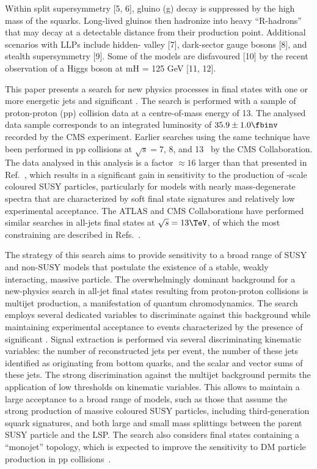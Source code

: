 Within split supersymmetry [5, 6], gluino (g) decay is suppressed by
the high mass of the squarks. Long-lived gluinos then hadronize into
heavy ``R-hadrons'' that may decay at a detectable distance from their
production point. Additional scenarios with LLPs include hidden-
valley [7], dark-sector gauge bosons [8], and stealth supersymmetry
[9]. Some of the models are disfavoured [10] by the recent observation
of a Higgs boson at mH = 125 GeV [11, 12].


This paper presents a search for new physics processes in final states
with one or more energetic jets and significant \ptvecmiss. The search
is performed with a sample of proton-proton (pp) collision data at a
centre-of-mass energy of 13\TeV. The analysed data sample corresponds
to an integrated luminosity of $35.9 \pm 1.0 \fbinv$ recorded by the
CMS experiment. Earlier searches using the same technique have been
performed in pp collisions at $\sqrt{s} = 7$, 8, and
13\TeV~\cite{RA1Paper, RA1Paper2011, RA1Paper2011FULL, RA1Paper2012,
  RA1Parked, Khachatryan:2016dvc} by the CMS Collaboration. The data
analysed in this analysis is a factor ${\approx}16$ larger than that
presented in Ref.~\cite{Khachatryan:2016dvc}, which results in a
significant gain in sensitivity to the production of \TeV-scale
coloured SUSY particles, particularly for models with nearly
mass-degenerate spectra that are characterized by soft final state
signatures and relatively low experimental acceptance. The ATLAS and
CMS Collaborations have performed similar searches in all-jets final
states at $\sqrt{s} = 13\TeV$, of which the most constraining are
described in Refs.~\cite{}.

The strategy of this search aims to provide sensitivity to a broad
range of SUSY and non-SUSY models that postulate the existence of a
stable, weakly interacting, massive particle. The overwhelmingly
dominant background for a new-physics search in all-jet final states
resulting from proton-proton collisions is multijet production, a
manifestation of quantum chromodynamics. The search employs several
dedicated variables to discriminate against this background while
maintaining experimental acceptance to events characterized by the
presence of significant \ptvecmiss. Signal extraction is performed via
several discriminating kinematic variables: the number of
reconstructed jets per event, the number of these jets identified as
originating from bottom quarks, and the scalar and vector \pt sums of
these jets. The strong discrimination against the multijet background
permits the application of low thresholds on kinematic variables. This
allows to maintain a large acceptance to a broad range of models, such
as those that assume the strong production of massive coloured SUSY
particles, including third-generation squark signatures, and both
large and small mass splittings between the parent SUSY particle and
the LSP. The search also considers final states containing a
``monojet'' topology, which is expected to improve the sensitivity to
DM particle production in pp collisions~\cite{Fox:2012ee,
  Buchmueller:2015eea}.


